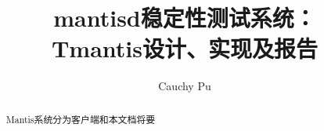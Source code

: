 \documentclass{article}
\title{mantisd稳定性测试系统：\\Tmantis设计、实现及报告}
\author{Cauchy Pu}
\begin{document}
\maketitle{}

\begin{abstract}
Mantis系统分为客户端和本文档将要
\end{abstract}

\clearpage

\tableofcontents

\clearpage

\end{document}
